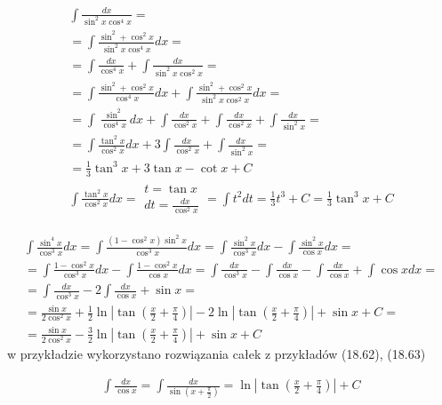 
\begin{gather*}\int \frac{dx}{\sin^2 x \cos^4 x} = \\
= \int \frac{\sin^2+\cos^2 x}{\sin^2 x \cos^4 x}dx = \\
= \int \frac{dx}{\cos^4 x}+\int \frac{dx}{\sin^2 x\cos^2x} = \\
= \int \frac{\sin^2+\cos^2 x}{\cos^4 x}dx+\int \frac{\sin^2+\cos^2 x}{\sin^2 x\cos^2x}dx = \\
= \int \frac{\sin^2}{\cos^4 x}dx+\int \frac{dx}{\cos^2 x}+\int \frac{dx}{\cos^2 x}+\int \frac{dx}{\sin^2 x} = \\
= \int \frac{\tan^2 x}{\cos^2 x}dx+3\int \frac{dx}{\cos^2 x}+\int \frac{dx}{\sin^2 x} = \\
= \frac{1}{3}\tan^3 x+3\tan x-\cot x+C \\
\int \frac{\tan^2 x}{\cos^2 x}dx = \begin{array}{|l|} t=\tan x \\ dt=\frac{dx}{\cos^2 x} \end{array} = \int t^2 dt = \frac{1}{3}t^3+C = \frac{1}{3}\tan^3x+C\end{gather*}



\begin{gather*}\int \frac{\sin^4 x}{\cos^3 x}dx = \int \frac{(1-\cos^2 x)\sin^2 x}{\cos^3 x}dx = \int \frac{\sin^2 x}{\cos^3 x}dx - \int \frac{\sin^2 x}{\cos x}dx =  \\
= \int \frac{1-\cos^2 x}{\cos^3 x}dx - \int \frac{1-\cos^2 x}{\cos x}dx = \int \frac{dx}{\cos^3 x}-\int \frac{dx}{\cos x}-\int \frac{dx}{\cos x}+\int \cos x dx =  \\
= \int \frac{dx}{\cos^3 x}-2\int \frac{dx}{\cos x}+\sin x =  \\
= \frac{\sin x}{2\cos^2 x} + \frac{1}{2}\ln|\tan(\frac{x}{2}+\frac{\pi}{4})|-2\ln|\tan (\frac{x}{2}+\frac{\pi}{4})|+\sin x+C =  \\
= \frac{\sin x}{2\cos^2 x} - \frac{3}{2}\ln|\tan(\frac{x}{2}+\frac{\pi}{4})|+\sin x+C\end{gather*}
w przykładzie wykorzystano rozwiązania całek z przykładów (18.62), (18.63)

\begin{gather*}\int \frac{dx}{\cos x}=\int \frac{dx}{\sin(x+\frac{\pi}{2})}=\ln|\tan (\frac{x}{2}+\frac{\pi}{4})|+C\end{gather*}



